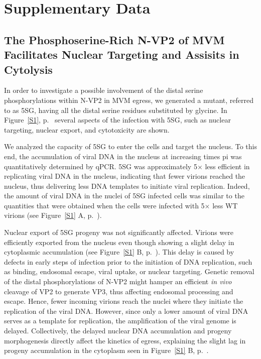 
\chapter{Supplementary Data} %

\label{Results} %


\section{The Phosphoserine-Rich N-VP2 of MVM Facilitates Nuclear Targeting and Assisits in Cytolysis}
\label{Cytoskeleton}


\renewcommand{\thefigure}{S\arabic{figure}}
\setcounter{figure}{0}

In order to investigate a possible involvement of the distal serine phosphorylations within N-VP2 in MVM egress, we generated a mutant, referred to as 5SG, having all the distal serine residues substituted by glycine. In Figure~\ref{S1}, p.~\pageref{S1} several aspects of the infection with 5SG, such as nuclear targeting, nuclear export, and cytotoxicity are shown.

We analyzed the capacity of 5SG to enter the cells and target the nucleus. To this end, the accumulation of viral DNA in the nucleus at increasing times pi was quantitatively determined by qPCR. 5SG was approximately 5$\times$ less efficient in replicating viral DNA in the nucleus, indicating that fewer virions reached the nucleus, thus delivering less DNA templates to initiate viral replication. Indeed, the amount of viral DNA in the nuclei of 5SG infected cells was similar to the quantities that were obtained when the cells were infected with 5$\times$ less WT virions (see Figure~\ref{S1} A, p.~\pageref{S1}).

Nuclear export of 5SG progeny was not significantly affected. Virions were efficiently exported from the nucleus even though showing a slight delay in cytoplasmic accumulation (see Figure~\ref{S1} B, p.~\pageref{S1}). This delay is caused by defects in early steps of infection prior to the initiation of DNA replication, such as binding, endosomal escape, viral uptake, or nuclear targeting. Genetic removal of the distal phosphorylations of N-VP2 might hamper an efficient \textit{in vivo} cleavage of VP2 to generate VP3, thus affecting endosomal processing and escape. Hence, fewer incoming virions reach the nuclei where they initiate the replication of the viral DNA. However, since only a lower amount of viral DNA serves as a template for replication, the amplification of the viral genome is delayed. Collectively, the delayed nuclear DNA accumulation and progeny morphogenesis directly affect the kinetics of egress, explaining the slight lag in progeny accumulation in the cytoplasm seen in Figure~\ref{S1} B, p.~\pageref{S1}.          
 
